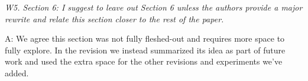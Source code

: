 


 







\mbox{}

\emph{W5. Section 6: I suggest to leave out Section 6 unless the authors provide a major rewrite and relate this section closer to the rest of the paper.}

A: We agree this section was not fully fleshed-out and requires more space to fully explore. In the revision we instead summarized its idea as part of future work and used the extra space for the other revisions and experiments we've added. %



